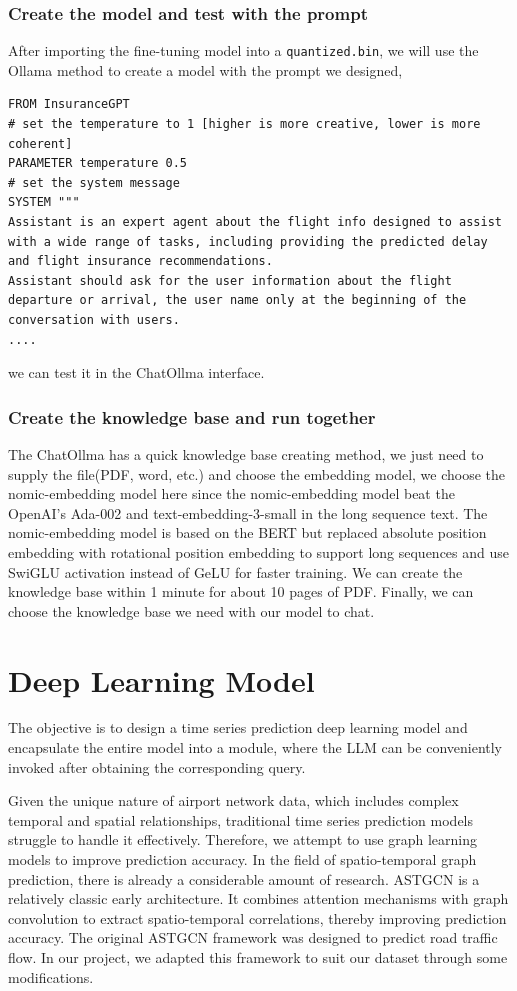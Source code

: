 \documentclass[conference]{IEEEtran}
\begin{document}
\subsubsection{Create the model and test with the prompt}
After importing the fine-tuning model into a \verb|quantized.bin|, we will use the Ollama method to create a model with the prompt we designed,
\begin{Verbatim}[breaklines=true]
FROM InsuranceGPT
# set the temperature to 1 [higher is more creative, lower is more coherent]
PARAMETER temperature 0.5
# set the system message
SYSTEM """
Assistant is an expert agent about the flight info designed to assist with a wide range of tasks, including providing the predicted delay and flight insurance recommendations.
Assistant should ask for the user information about the flight departure or arrival, the user name only at the beginning of the conversation with users.
....
\end{Verbatim}
 we can test it in the ChatOllma interface.

\subsubsection{Create the knowledge base and run together}
The ChatOllma has a quick knowledge base creating method, we just need to supply the file(PDF, word, etc.) and choose the embedding model, we choose the nomic-embedding model here since the nomic-embedding model beat the OpenAI's Ada-002 and text-embedding-3-small in the long sequence text. The nomic-embedding model is based on the BERT but replaced absolute position embedding with rotational position embedding to support long sequences and use SwiGLU activation instead of GeLU for faster training. We can create the knowledge base within 1 minute for about 10 pages of PDF. Finally, we can choose the knowledge base we need with our model to chat.

\section{Deep Learning Model}

The objective is to design a time series prediction deep learning model and encapsulate the entire model into a module, where the LLM can be conveniently invoked after obtaining the corresponding query. 

Given the unique nature of airport network data, which includes complex temporal and spatial relationships, traditional time series prediction models struggle to handle it effectively. Therefore, we attempt to use graph learning models to improve prediction accuracy. In the field of spatio-temporal graph prediction, there is already a considerable amount of research. ASTGCN \cite{guo2019attention} is a relatively classic early architecture. It combines attention mechanisms with graph convolution to extract spatio-temporal correlations, thereby improving prediction accuracy. The original ASTGCN framework was designed to predict road traffic flow. In our project, we adapted this framework to suit our dataset through some modifications.
\end{document}

